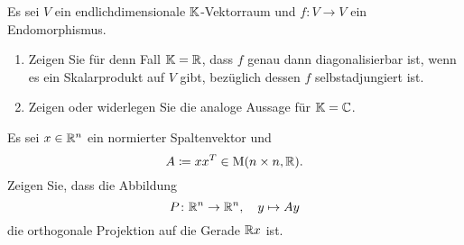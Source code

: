 \documentclass[a4paper,10pt]{scrartcl}
\begin{document}
\begin{question}
  Es sei $V$ ein endlichdimensionale $\mathbb{K}$-Vektorraum und $f \colon V \to V$ ein Endomorphismus.
  \begin{enumerate}[leftmargin=*]
    \item
      Zeigen Sie für denn Fall $\mathbb{K} = \mathbb{R}$, dass $f$ genau dann diagonalisierbar ist, wenn es ein Skalarprodukt auf $V$ gibt, bezüglich dessen $f$ selbstadjungiert ist.
    \item
      Zeigen oder widerlegen Sie die analoge Aussage für $\mathbb{K} = \mathbb{C}$.
  \end{enumerate}
\end{question}


\begin{question}
  Es sei $x \in \mathbb{R}^n$ ein normierter Spaltenvektor und
  \[
    A \coloneqq x x^T \in \operatorname{M}(n \times n, \mathbb{R}).
  \]
  Zeigen Sie, dass die Abbildung
  \[
    P \colon \mathbb{R}^n \to \mathbb{R}^n,
    \quad
    y \mapsto Ay
  \]
  die orthogonale Projektion auf die Gerade $\mathbb{R} x$ ist.
\end{question}
\end{document}
